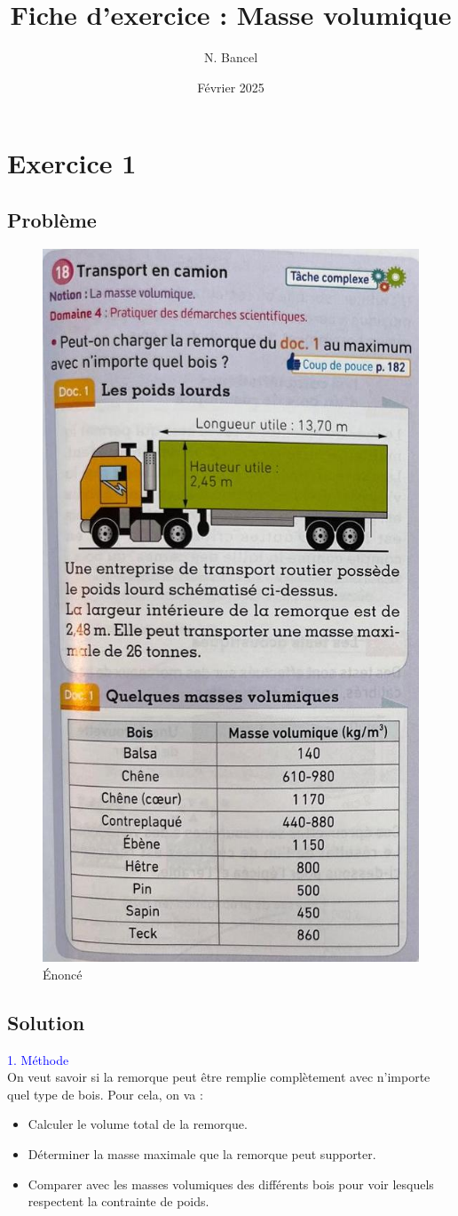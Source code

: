 \documentclass[a4paper,12pt]{article}
\begin{document}
\title{Fiche d'exercice : Masse volumique}
\author{N. Bancel}
\date{Février 2025}

\maketitle

\section{Exercice 1}

\subsection{Problème}


\begin{figure}[H]
    \centering
    \includegraphics[width=0.4\linewidth]{04_03_02.jpeg}
    \caption{\label{} Énoncé}
  \end{figure}

\subsection{Solution}

\textcolor{blue}{1. Méthode} \\

On veut savoir si la remorque peut être remplie complètement avec n'importe quel type de bois. Pour cela, on va :
\begin{itemize}
    \item Calculer le volume total de la remorque.
    \item Déterminer la masse maximale que la remorque peut supporter.
    \item Comparer avec les masses volumiques des différents bois pour voir lesquels respectent la contrainte de poids.
\end{itemize}
\end{document}
